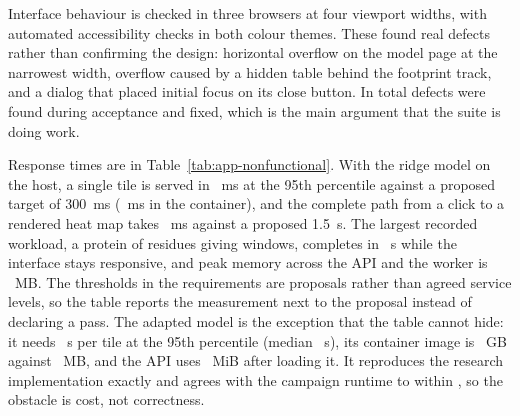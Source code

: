 \begin{table}[htbp]
  \centering
  \caption[Executed test suites of the first release]{Executed test suites of the first release. Counts are the numbers reported by the runners
  on the acceptance date, not historical figures. Rows marked container come from the second record
  of that day, after the move to containers; coverage was measured only in the host run.}
  \label{tab:app-tests}
  
\end{table}


Interface behaviour is checked in three browsers at four viewport widths, with automated
accessibility checks in both colour themes. These found real defects rather than confirming the
design: horizontal overflow on the model page at the narrowest width, overflow caused by a hidden
table behind the footprint track, and a dialog that placed initial focus on its close button. In
total \nAppDefects{} defects were found during acceptance and fixed, which is the main argument that
the suite is doing work.

Response times are in Table~\ref{tab:app-nonfunctional}. With the ridge model on the host, a single
tile is served in \nAppTilePfive{}~ms at the 95th percentile against a proposed target of 300~ms
(\nAppRidgeContainerPfive{}~ms in the container), and the complete
path from a click to a rendered heat map takes \nAppHeatmapPfive{}~ms against a proposed 1.5~s. The
largest recorded workload, a protein of \nAppProteinLen{} residues giving \nAppProteinTiles{}
windows, completes in \nAppProteinSeconds{}~s while the interface stays responsive, and peak memory
across the API and the worker is \nAppPeakMemory{}~MB. The thresholds in the requirements are
proposals rather than agreed service levels, so the table reports the measurement next to the
proposal instead of declaring a pass. The adapted model is the exception that the table cannot
hide: it needs \nAppLoraLatPfive{}~s per tile at the 95th percentile (median \nAppLoraLatMedian{}~s), its
container image is \nAppImageLoraGb{}~GB against \nAppImageNpzMb{}~MB, and the API uses
\nAppApiMemLora{}~MiB after loading it. It reproduces the research implementation exactly and agrees
with the campaign runtime to within \nAppLoraParityCuda{}, so the obstacle is cost, not correctness.

\begin{table}[htbp]
  \centering
  \caption[Measured non-functional properties]{Measured non-functional properties. The proposed column is the target stated in the
  requirements, which is a planning figure rather than an agreed service level. Items marked
  ``recorded'' had no numeric target.}
  \label{tab:app-nonfunctional}
  
\end{table}

